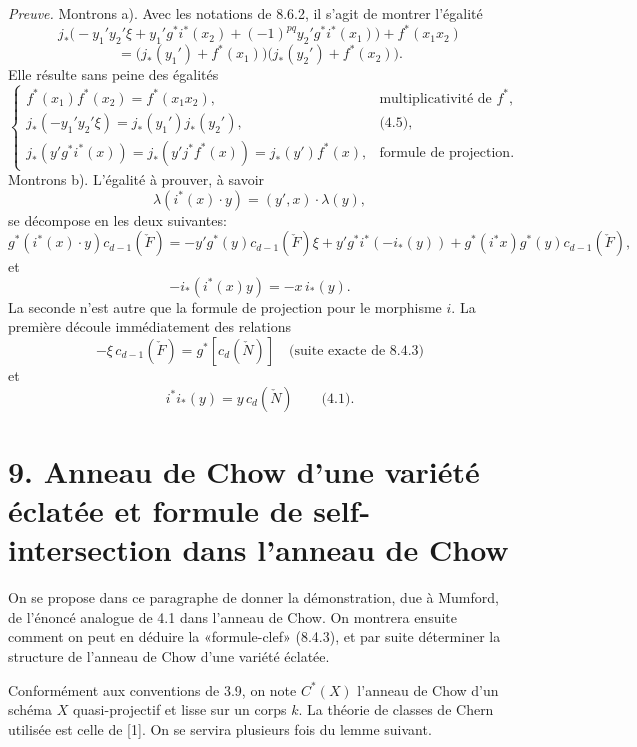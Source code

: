 \documentclass[11pt]{article}
\begin{document}
\emph{Preuve.} Montrons a). Avec les notations de 8.6.2, il s'agit de montrer l'égalité
\[
j_*\bigl(-y_1'y_2'\xi+y_1'g^*i^*(x_2)+(-1)^{pq}y_2'g^*i^*(x_1)\bigr)+f^*(x_1x_2)
\]
\[
=\bigl(j_*(y_1')+f^*(x_1)\bigr)\bigl(j_*(y_2')+f^*(x_2)\bigr).
\]
Elle résulte sans peine des égalités
\[
\begin{cases}
f^*(x_1)f^*(x_2)=f^*(x_1x_2),&\text{multiplicativité de }f^*,\\
j_*(-y_1'y_2'\xi)=j_*(y_1')j_*(y_2'),&\text{(4.5)},\\
j_*(y'g^*i^*(x))=j_*(y'j^*f^*(x))=j_*(y')f^*(x),&\text{formule de projection}.
\end{cases}
\]
Montrons b). L'égalité à prouver, à savoir
\[
\lambda(i^*(x)\cdot y)=(y',x)\cdot\lambda(y),
\]
se décompose en les deux suivantes:
\[
g^*(i^*(x)\cdot y)c_{d-1}(\check F)
=
-y'g^*(y)c_{d-1}(\check F)\xi
+y'g^*i^*(-i_*(y))
+g^*(i^*x)g^*(y)c_{d-1}(\check F),
\]
et
\[
-i_*(i^*(x)y)=-x\,i_*(y).
\]
La seconde n'est autre que la formule de projection pour le morphisme $i$. La première découle immédiatement des relations
\[
-\xi\,c_{d-1}(\check F)=g^*[c_d(\check N)]
\quad\text{(suite exacte de 8.4.3)}
\]
et
\[
i^*i_*(y)=y\,c_d(\check N)\qquad\text{(4.1)}.
\]

\section*{9. Anneau de Chow d'une variété éclatée et formule de self-intersection dans l'anneau de Chow}

On se propose dans ce paragraphe de donner la démonstration, due à Mumford, de l'énoncé analogue de 4.1 dans l'anneau de Chow. On montrera ensuite comment on peut en déduire la «formule-clef» (8.4.3), et par suite déterminer la structure de l'anneau de Chow d'une variété éclatée.

Conformément aux conventions de 3.9, on note $C^*(X)$ l'anneau de Chow d'un schéma $X$ quasi-projectif et lisse sur un corps $k$. La théorie de classes de Chern utilisée est celle de [1]. On se servira plusieurs fois du lemme suivant.
\end{document}
